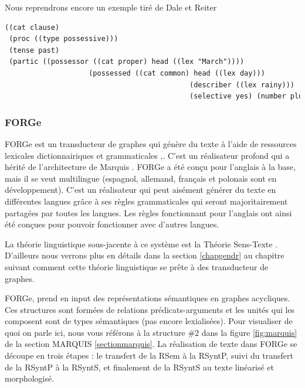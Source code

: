 Nous reprendrons encore un exemple tiré de Dale et Reiter \cite{ReiterBuildingNaturalLanguage2000} 
\begin{lstlisting}[language=Xml, caption=FD: input de Surge, label=surge]
((cat clause)
 (proc ((type possessive)))
 (tense past)
 (partic ((possessor ((cat proper) head ((lex "March"))))
					(possessed ((cat common) head ((lex day)))
											(describer ((lex rainy)))
											(selective yes) (number plural)))))
\end{lstlisting}

\subsubsection{FORGe}
FORGe est un transducteur de graphes qui génère du texte à l'aide de ressources lexicales dictionnairiques et grammaticales \citep{MilledemoFORGePompeu2017},\citep{DBLP:conf/semeval/MilleCBW17}. C'est un réalisateur profond qui a hérité de l'architecture de Marquis \citep{WannerMARQUISGENERATIONUSERTAILORED2010}. FORGe a été conçu pour l'anglais à la base, mais il se veut multilingue (espagnol, allemand, français et polonais sont en développement). C'est un réalisateur qui peut aisément générer du texte en différentes langues grâce à ses règles grammaticales qui seront majoritairement partagées par toutes les langues. Les règles fonctionnant pour l'anglais ont ainsi été conçues pour pouvoir fonctionner avec d'autres langues.

La théorie linguistique sous-jacente à ce système est la Théorie Sens-Texte \citep{melcuk1988} \citep{MelcukSemanticsmeaningtext2012}. D'ailleurs nous verrons plus en détails dans la section \ref{chapgendr} au chapitre suivant comment cette théorie linguistique se prête à des transducteur de graphes.

FORGe, prend en input des représentations sémantiques en graphes acycliques. Ces structures sont formées de relations prédicats-arguments et les unités qui les composent sont de types sémantiques (pas encore lexialisées). Pour visualiser de quoi on parle ici, nous vous référons à la structure \#2 dans la figure \ref{fig:marquis} de la section MARQUIS \ref{sectionmarquis}. La réalisation de texte dans FORGe se découpe en trois étapes : le transfert de la RSem à la RSyntP, suivi du transfert de la RSyntP à la RSyntS, et finalement de la RSyntS au texte linéarisé et morphologisé. 


